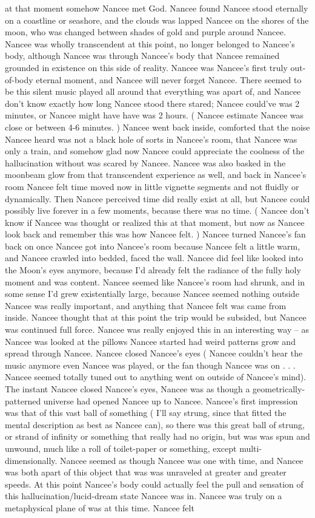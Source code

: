 \documentclass[12pt]{book}
\begin{document}
at that moment somehow Nancee met God. Nancee found Nancee stood eternally on a coastline or seashore, and the clouds was lapped Nancee on the shores of the moon, who was changed between shades of gold and purple around Nancee. Nancee was wholly transcendent at this point, no longer belonged to Nancee's body, although Nancee was through Nancee's body that Nancee remained grounded in existence on this side of reality. Nancee was Nancee's first truly out-of-body eternal moment, and Nancee will never forget Nancee. There seemed to be this silent music played all around that everything was apart of, and Nancee don't know exactly how long Nancee stood there stared; Nancee could've was 2 minutes, or Nancee might have have was 2 hours. ( Nancee estimate Nancee was close or between 4-6 minutes. ) Nancee went back inside, comforted that the noise Nancee heard was not a black hole of sorts in Nancee's room, that Nancee was only a train, and somehow glad now Nancee could appreciate the coolness of the hallucination without was scared by Nancee. Nancee was also basked in the moonbeam glow from that transcendent experience as well, and back in Nancee's room Nancee felt time moved now in little vignette segments and not fluidly or dynamically. Then Nancee perceived time did really exist at all, but Nancee could possibly live forever in a few moments, because there was no time. ( Nancee don't know if Nancee was thought or realized this at that moment, but now as Nancee look back and remember this was how Nancee felt. ) Nancee turned Nancee's fan back on once Nancee got into Nancee's room because Nancee felt a little warm, and Nancee crawled into bedded, faced the wall. Nancee did feel like looked into the Moon's eyes anymore, because I'd already felt the radiance of the fully holy moment and was content. Nancee seemed like Nancee's room had shrunk, and in some sense I'd grew existentially large, because Nancee seemed nothing outside Nancee was really important, and anything that Nancee felt was came from inside. Nancee thought that at this point the trip would be subsided, but Nancee was continued full force. Nancee was really enjoyed this in an interesting way -- as Nancee was looked at the pillows Nancee started had weird patterns grow and spread through Nancee. Nancee closed Nancee's eyes ( Nancee couldn't hear the music anymore even Nancee was played, or the fan though Nancee was on  . . .  Nancee seemed totally tuned out to anything went on outside of Nancee's mind). The instant Nancee closed Nancee's eyes, Nancee was as though a geometrically-patterned universe had opened Nancee up to Nancee. Nancee's first impression was that of this vast ball of something ( I'll say strung, since that fitted the mental description as best as Nancee can), so there was this great ball of strung, or strand of infinity or something that really had no origin, but was was spun and unwound, much like a roll of toilet-paper or something, except multi-dimensionally. Nancee seemed as though Nancee was one with time, and Nancee was both apart of this object that was was unraveled at greater and greater speeds. At this point Nancee's body could actually feel the pull and sensation of this hallucination/lucid-dream state Nancee was in. Nancee was truly on a metaphysical plane of was at this time. Nancee felt 
\end{document}
